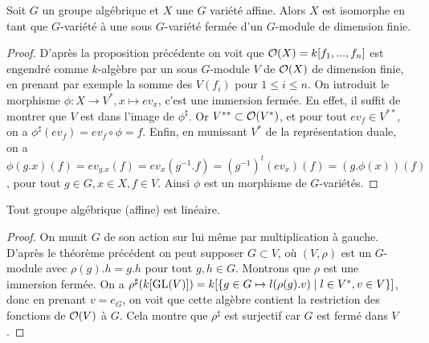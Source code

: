 \begin{thm}\label{embed}
Soit $G$ un groupe algébrique et $X$ une $G$ variété affine. Alors $X$ est isomorphe en tant que $G$-variété à une sous $G$-variété fermée d'un $G$-module de dimension finie.
\end{thm}
\begin{proof}
D'après la proposition précédente on voit que $\mathcal{O}(X)=k[f_1,...,f_n]$ est engendré comme $k$-algèbre par un sous $G$-module $V$ de $\mathcal{O}(X)$ de dimension finie, en prenant par exemple la somme des $V(f_i)$ pour $1\leq i\leq n$. On introduit le morphisme $\phi:X\rightarrow V^*, x\mapsto ev_x$, c'est une immersion fermée. En effet, il suffit de montrer que $V$ est dans l'image de $\phi^\sharp$. Or $V^{**}\subset \mathcal{O}(V^*)$, et pour tout $ev_f\in V^{**}$, on a $\phi^\sharp(ev_f)=ev_f\circ\phi=f$. Enfin, en munissant $V^*$ de la représentation duale, on a $\phi(g.x)(f)=ev_{g.x}(f)=ev_x( g^{-1}.f)=(g^{-1})^t(ev_x)(f)=(g.\phi(x))(f)$, pour tout $g\in G, x\in X,f\in V$. Ainsi $\phi$ est un morphisme de $G$-variétés.
\end{proof}

\begin{cor}
Tout groupe algébrique (affine) est linéaire.
\end{cor}
\begin{proof}
On munit $G$ de son action sur lui même par multiplication à gauche. D'après le théorème précédent on peut supposer $G\subset V$, où $(V,\rho)$ est un $G$-module avec $\rho(g).h=g.h$ pour tout $g,h\in G$. Montrons que $\rho$ est une immersion fermée. On a $\rho^\sharp(k[\operatorname{GL}(V)])=k[\lbrace g\in G\mapsto l(\rho(g).v)\mid l\in V^*,v\in V\rbrace]$, donc en prenant $v=e_G$, on voit que cette algèbre contient la restriction des fonctions de $\mathcal{O}(V)$ à $G$. Cela montre que $\rho^\sharp$ est surjectif car $G$ est fermé dans $V$.
\end{proof}


